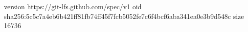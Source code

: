 version https://git-lfs.github.com/spec/v1
oid sha256:5c5c7a4eb6b421ff81fb74ff45f7fcb5052fe7c6f4bcf6aba341ea0e3b9d548c
size 16736
